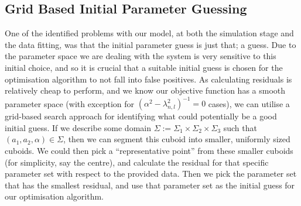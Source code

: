 \subsection{Grid Based Initial Parameter Guessing}
One of the identified problems with our model, at both the simulation stage and the data fitting, was that the initial parameter 
guess is just that; a guess. Due to the parameter space we are dealing with the system is very sensitive to this initial choice, and 
so it is crucial that a suitable initial guess is chosen for the optimisation algorithm to not fall into false positives. 
As calculating residuals is relatively cheap to perform, and we know our objective function has a smooth parameter space (with 
exception for $(\alpha^2 - \lambda_{n,l}^2)^{-1} = 0$ cases), we can utilise a grid-based search approach for identifying 
what could potentially be a good initial guess. If we describe some domain $\Sigma := \Sigma_1 \times \Sigma_2 \times \Sigma_3$ such 
that $(a_1, a_2, \alpha) \in \Sigma$, then we can segment this cuboid into smaller, uniformly sized cuboids. We could then 
pick a ``representative point'' from these smaller cuboids (for simplicity, say the centre), and calculate the residual for that 
specific parameter set with respect to the provided data. Then we pick the parameter set that has the smallest residual, and 
use that parameter set as the initial guess for our optimisation algorithm.